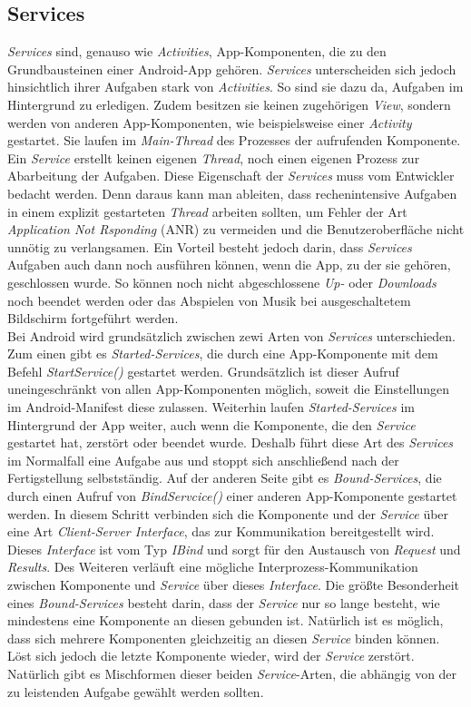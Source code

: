 \subsection{Services}
\label{ssec:android-services}
\textit{Services} sind, genauso wie \textit{Activities}, App-Komponenten, die zu den Grundbausteinen einer Android-App gehören. \textit{Services} unterscheiden sich jedoch hinsichtlich ihrer Aufgaben stark von \textit{Activities}. So sind sie dazu da, Aufgaben im Hintergrund zu erledigen. Zudem besitzen sie keinen zugehörigen \textit{View}, sondern werden von anderen App-Komponenten, wie beispielsweise einer \textit{Activity} gestartet. Sie laufen im \textit{Main-Thread} des Prozesses der aufrufenden Komponente. Ein \textit{Service} erstellt keinen eigenen \textit{Thread}, noch einen eigenen Prozess zur Abarbeitung der Aufgaben. Diese Eigenschaft der \textit{Services} muss vom Entwickler bedacht werden. Denn daraus kann man ableiten, dass rechenintensive Aufgaben in einem explizit gestarteten \textit{Thread} arbeiten sollten, um Fehler der Art \textit{Application Not Rsponding} (ANR) zu vermeiden und die Benutzeroberfläche nicht unnötig zu verlangsamen. Ein Vorteil besteht jedoch darin, dass \textit{Services} Aufgaben auch dann noch ausführen können, wenn die App, zu der sie gehören, geschlossen wurde. So können noch nicht abgeschlossene \textit{Up-} oder \textit{Downloads} noch beendet werden oder das Abspielen von Musik bei ausgeschaltetem Bildschirm fortgeführt werden.\\
Bei Android wird grundsätzlich zwischen zewi Arten von \textit{Services} unterschieden. Zum einen gibt es \textit{Started-Services}, die durch eine App-Komponente mit dem Befehl \textit{StartService()} gestartet werden. Grundsätzlich ist dieser Aufruf uneingeschränkt von allen App-Komponenten möglich, soweit die Einstellungen im Android-Manifest diese zulassen. Weiterhin laufen \textit{Started-Services} im Hintergrund der App weiter, auch wenn die Komponente, die den \textit{Service} gestartet hat, zerstört oder beendet wurde. Deshalb führt diese Art des \textit{Services} im Normalfall eine Aufgabe aus und stoppt sich anschließend nach der Fertigstellung selbstständig. Auf der anderen Seite gibt es \textit{Bound-Services}, die durch einen Aufruf von \textit{BindServcice()} einer anderen App-Komponente gestartet werden. In diesem Schritt verbinden sich die Komponente und der \textit{Service} über eine Art \textit{Client-Server Interface}, das zur Kommunikation bereitgestellt wird. Dieses \textit{Interface} ist vom Typ \textit{IBind} und sorgt für den Austausch von \textit{Request} und \textit{Results}. Des Weiteren verläuft eine mögliche Interprozess-Kommunikation zwischen Komponente und \textit{Service} über dieses \textit{Interface}. Die größte Besonderheit eines \textit{Bound-Services} besteht darin, dass der \textit{Service} nur so lange besteht, wie mindestens eine Komponente an diesen gebunden ist. Natürlich ist es möglich, dass sich mehrere Komponenten gleichzeitig an diesen \textit{Service} binden können. Löst sich jedoch die letzte Komponente wieder, wird der \textit{Service} zerstört. Natürlich gibt es Mischformen dieser beiden \textit{Service}-Arten, die abhängig von der zu leistenden Aufgabe gewählt werden sollten. 

